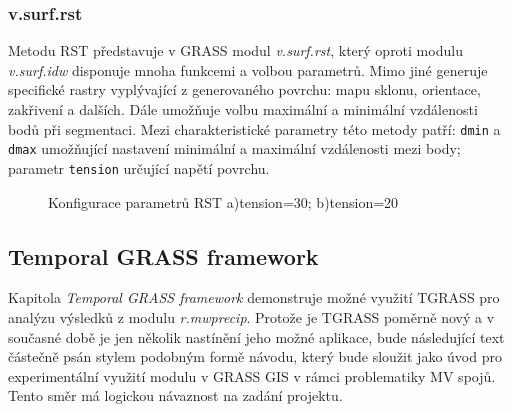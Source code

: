 \documentclass[a4paper,12pt,oneside]{report}
\begin{document}
\subsubsection*{v.surf.rst}
Metodu RST představuje v GRASS modul \textit{v.surf.rst}, který oproti
modulu \textit{v.surf.idw} disponuje mnoha funkcemi a volbou
parametrů. Mimo jiné generuje specifické rastry vyplývající z
generovaného povrchu: mapu sklonu, orientace, zakřivení a
dalších. Dále umožňuje volbu maximální a minimální vzdálenosti bodů
při segmentaci. Mezi charakteristické parametry této metody patří:
\texttt{dmin} a \texttt{dmax} umožňující nastavení minimální a
maximální vzdálenosti mezi body; parametr \texttt{tension} určující
napětí povrchu.

\begin{figure}[h!]%
    \centering
    \qquad
    \caption[Interpolace RST]{Konfigurace parametrů RST a)tension=30; b)tension=20 \centering}%
    \label{fig:example}%
\end{figure}

\subsection{Temporal GRASS framework}
Kapitola \textit{Temporal GRASS framework} demonstruje možné využití
TGRASS pro analýzu výsledků z modulu \textit{r.mwprecip}.  Protože je
TGRASS poměrně nový a v současné době je jen několik nastínění jeho
možné aplikace, bude následující text částečně psán stylem podobným
formě návodu, který bude sloužit jako úvod pro experimentální využití
modulu v GRASS GIS v rámci problematiky MV spojů. Tento směr má
logickou návaznost na zadání projektu.
\end{document}
